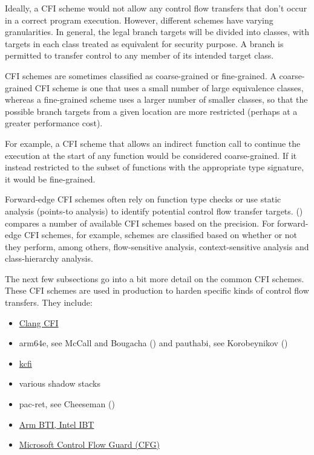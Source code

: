 \documentclass[
  a4paper,
]{report}
\providecommand{\tightlist}{%
  \setlength{\itemsep}{0pt}\setlength{\parskip}{0pt}}
\begin{document}
Ideally, a CFI scheme would not allow any control flow transfers that
don't occur in a correct program execution. However, different schemes
have varying granularities. In general, the legal branch targets will be
divided into classes, with targets in each class treated as equivalent
for security purpose. A branch is permitted to transfer control to any
member of its intended target class.

CFI schemes are sometimes classified as
\label{__index_entry_35}{coarse-grained}
or
\label{__index_entry_36}{fine-grained}.
A coarse-grained CFI scheme is one that uses a small number of large
equivalence classes, whereas a fine-grained scheme uses a larger number
of smaller classes, so that the possible branch targets from a given
location are more restricted (perhaps at a greater performance cost).

For example, a CFI scheme that allows an indirect function call to
continue the execution at the start of any function would be considered
coarse-grained. If it instead restricted to the subset of functions with
the appropriate type signature, it would be fine-grained.

Forward-edge CFI schemes often rely on function type checks or use
static analysis (points-to analysis) to identify potential control flow
transfer targets. () compares
a number of available CFI schemes based on the precision. For
forward-edge CFI schemes, for example, schemes are classified based on
whether or not they perform, among others, flow-sensitive analysis,
context-sensitive analysis and class-hierarchy analysis.

The next few subsections go into a bit more detail on the common CFI
schemes. These CFI schemes are used in production to harden specific
kinds of control flow transfers. They include:

\begin{itemize}
\tightlist
\item
  \href{https://clang.llvm.org/docs/ControlFlowIntegrityDesign.html}{Clang
  CFI}
\item
  arm64e, see McCall and Bougacha () and
  pauthabi, see Korobeynikov ()
\item
  \href{https://reviews.llvm.org/D119296}{kcfi}
\item
  various shadow stacks
\item
  pac-ret, see Cheeseman ()
\item
  \href{https://en.wikipedia.org/wiki/Indirect_branch_tracking}{Arm BTI,
  Intel IBT}
\item
  \href{https://learn.microsoft.com/en-us/windows/win32/secbp/control-flow-guard}{Microsoft
  Control Flow Guard (CFG)}
\end{itemize}
\end{document}
